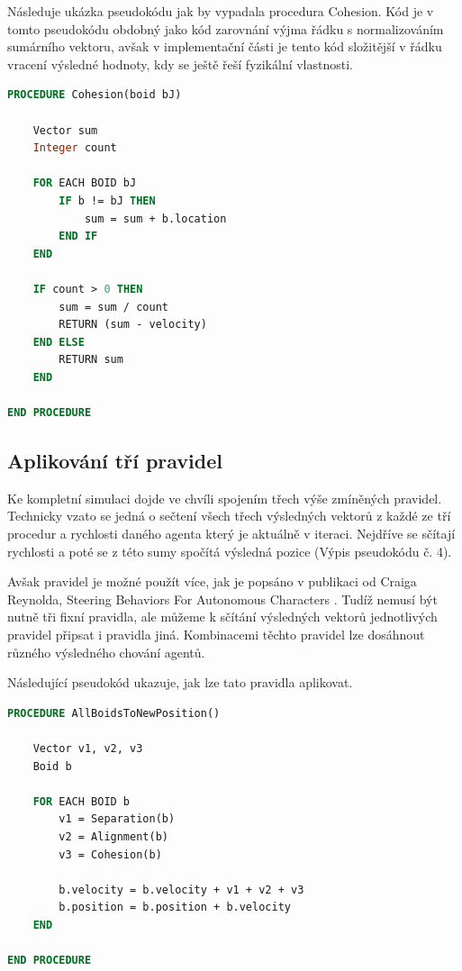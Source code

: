 \documentclass[czech,public,dept460,male,cpdeclaration]{diploma}
\begin{document}
Následuje ukázka pseudokódu jak by vypadala procedura Cohesion. Kód je v tomto pseudokódu obdobný jako kód zarovnání výjma řádku s normalizováním sumárního vektoru, avšak v implementační části je tento kód složitější v řádku vracení výsledné hodnoty, kdy se ještě řeší fyzikální vlastnosti.

\begin{lstlisting}[language=pascal,label=src:Cohesion pseudocode,caption=Pseudokód pro kohezi]
PROCEDURE Cohesion(boid bJ)

	Vector sum
	Integer count
	
	FOR EACH BOID bJ
		IF b != bJ THEN
			sum = sum + b.location
		END IF
	END
	
	IF count > 0 THEN
		sum = sum / count
		RETURN (sum - velocity)
	END ELSE
		RETURN sum
	END

END PROCEDURE
\end{lstlisting}

\subsection{Aplikování tří pravidel}\label{sec:aplikovani-tri-pravidel}
Ke kompletní simulaci dojde ve chvíli spojením třech výše zmíněných pravidel. Technicky vzato se jedná o sečtení všech třech výsledných vektorů z každé ze tří procedur a rychlosti daného agenta který je aktuálně v iteraci. Nejdříve se sčítají rychlosti a poté se z této sumy spočítá výsledná pozice (Výpis pseudokódu č. 4).

Avšak pravidel je možné použít více, jak je popsáno v publikaci od Craiga Reynolda, Steering Behaviors For Autonomous Characters \cite{linkToSteeringBehaviors}. Tudíž nemusí být nutně tři fixní pravidla, ale můžeme k sčítání výsledných vektorů jednotlivých pravidel připsat i pravidla jiná. Kombinacemi těchto pravidel lze dosáhnout různého výsledného chování agentů.

Následující pseudokód ukazuje, jak lze tato pravidla aplikovat.
\newpage
\begin{lstlisting}[language=pascal,label=src:Flocking pseudocode,caption=Pseudokód pro aplikování třech pravidel]
PROCEDURE AllBoidsToNewPosition()

	Vector v1, v2, v3
	Boid b
	
	FOR EACH BOID b
		v1 = Separation(b)
		v2 = Alignment(b)
		v3 = Cohesion(b)
		
		b.velocity = b.velocity + v1 + v2 + v3
		b.position = b.position + b.velocity
	END

END PROCEDURE
\end{lstlisting}
\end{document}
